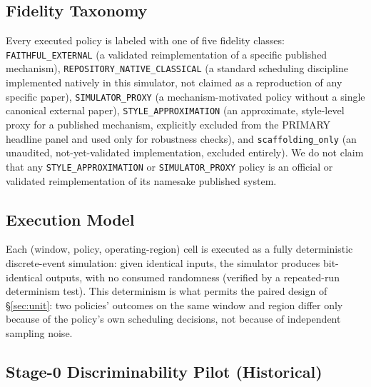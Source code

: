 \documentclass[sn-basic,Numbered,pdflatex]{sn-jnl}
\begin{document}
\subsection{Fidelity Taxonomy}
\label{sec:fidelity}

Every executed policy is labeled with one of five fidelity classes:
\texttt{FAITHFUL\_EXTERNAL} (a validated reimplementation of a specific
published mechanism), \texttt{REPOSITORY\_NATIVE\_CLASSICAL} (a standard
scheduling discipline implemented natively in this simulator, not claimed
as a reproduction of any specific paper), \texttt{SIMULATOR\_PROXY} (a
mechanism-motivated policy without a single canonical external paper),
\texttt{STYLE\_APPROXIMATION} (an approximate, style-level proxy for a
published mechanism, explicitly excluded from the PRIMARY headline panel
and used only for robustness checks), and \texttt{scaffolding\_only} (an
unaudited, not-yet-validated implementation, excluded entirely). We do not
claim that any \texttt{STYLE\_APPROXIMATION} or \texttt{SIMULATOR\_PROXY}
policy is an official or validated reimplementation of its namesake
published system.

\subsection{Execution Model}
\label{sec:execution-model}

Each (window, policy, operating-region) cell is executed as a fully
deterministic discrete-event simulation: given identical inputs, the
simulator produces bit-identical outputs, with no consumed randomness
(verified by a repeated-run determinism test). This determinism is what
permits the paired design of \S\ref{sec:unit}: two policies' outcomes on
the same window and region differ only because of the policy's own
scheduling decisions, not because of independent sampling noise.

\subsection{Stage-0 Discriminability Pilot (Historical)}
\label{sec:stage0}
\end{document}
